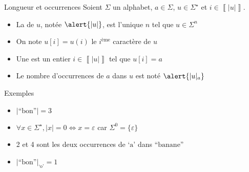 
\begingroup

\begin{frame}{Longueur et occurrences}
  Soient $\Sigma$ un alphabet, $a\in\Sigma$, $u\in \Sigma^\star$ et $i\in \left\llbracket |u|\right\rrbracket$.
  \begin{itemize}
  \item La  de $u$, notée $\alert{|u|}$, est l'unique $n$ tel que $u\in \Sigma^n$
  \item On note \alert{$u[i] = u(i)$} le $i^\text{ème}$ caractère de $u$
  \item Une  est un entier $i\in \left\llbracket |u|\right\rrbracket$ tel que $u[i]=a$
  \item Le nombre d'occurrences de $a$ dans $u$ est noté $\alert{|u|_a}$
  \end{itemize}

  \begin{exampleblock}{Exemples}
    \begin{itemize}
    \item $|\text{``bon''}| = 3$
    \item $\forall x\in \Sigma^\star, |x| = 0 \Leftrightarrow x = \varepsilon$ car $\Sigma^0 = \{\varepsilon\}$
    \item 2 et 4 sont les deux occurrences de $\text{`a'}$ dans $\text{``banane''}$
    \item $|\text{``bon''}|_{\text{`o'}} = 1$
    \end{itemize}
  \end{exampleblock}
\end{frame}

\endgroup
